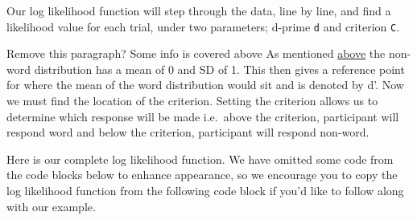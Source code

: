 \documentclass[]{book}
\begin{document}
Our log likelihood function will step through the data, line by line, and find a likelihood value for each trial, under two parameters; d-prime \texttt{d} and criterion \texttt{C}.

 Remove this paragraph? Some info is covered above
As mentioned \protect\hyperlink{sdtOutline}{above} the non-word distribution has a mean of 0 and SD of 1. This then gives a reference point for where the mean of the word distribution would sit and is denoted by d'.
Now we must find the location of the criterion. Setting the criterion allows us to determine which response will be made i.e.~above the criterion, participant will respond word and below the criterion, participant will respond non-word.

Here is our complete log likelihood function. We have omitted some code from the code blocks below to enhance appearance, so we encourage you to copy the log likelihood function from the following code block if you'd like to follow along with our example.
\end{document}
